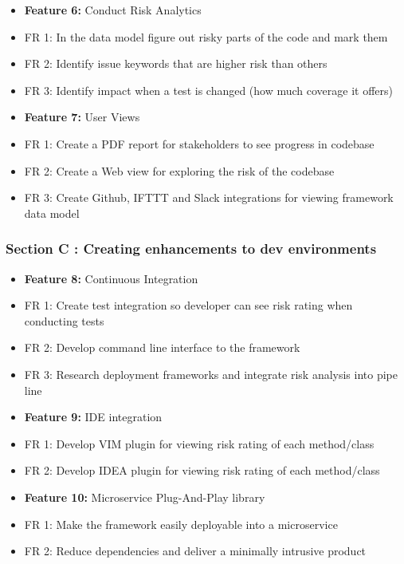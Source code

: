 \documentclass[11pt,]{article}
\begin{document}
\begin{itemize}
\item
  \textbf{Feature 6:} Conduct Risk Analytics
\item
  FR 1: In the data model figure out risky parts of the code and mark
  them
\item
  FR 2: Identify issue keywords that are higher risk than others
\item
  FR 3: Identify impact when a test is changed (how much coverage it
  offers)
\item
  \textbf{Feature 7:} User Views
\item
  FR 1: Create a PDF report for stakeholders to see progress in codebase
\item
  FR 2: Create a Web view for exploring the risk of the codebase
\item
  FR 3: Create Github, IFTTT and Slack integrations for viewing
  framework data model
\end{itemize}

\subsubsection{Section C : Creating enhancements to dev
environments}\label{section-c-creating-enhancements-to-dev-environments}

\begin{itemize}
\item
  \textbf{Feature 8:} Continuous Integration
\item
  FR 1: Create test integration so developer can see risk rating when
  conducting tests
\item
  FR 2: Develop command line interface to the framework
\item
  FR 3: Research deployment frameworks and integrate risk analysis into
  pipe line
\item
  \textbf{Feature 9:} IDE integration
\item
  FR 1: Develop VIM plugin for viewing risk rating of each method/class
\item
  FR 2: Develop IDEA plugin for viewing risk rating of each method/class
\item
  \textbf{Feature 10:} Microservice Plug-And-Play library
\item
  FR 1: Make the framework easily deployable into a microservice
\item
  FR 2: Reduce dependencies and deliver a minimally intrusive product
\end{itemize}
\end{document}
